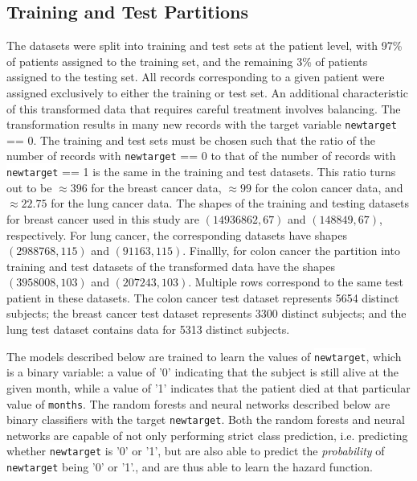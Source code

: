 \documentclass[10pt,letterpaper]{article}
\newcommand{\codewhite}[1]{\colorbox{white}{\texttt{#1}}}
\begin{document}
\subsection*{Training and Test Partitions}
\label{subsec:traintest}


The datasets were split into training and test sets at the patient level, with 97\% of patients assigned to the training set, and the remaining 3\% of patients assigned to the testing set.
All records corresponding to a given patient were assigned exclusively to either the training or test set.
An additional characteristic of this transformed data that requires careful treatment involves balancing. The transformation results in many new records with the target variable \codewhite{newtarget} == 0. The training and test sets must be chosen such that the ratio of the number of records with \codewhite{newtarget} == 0 to that of the number of records with \codewhite{newtarget} == 1 is the same in the training and test datasets.
This ratio turns out to be $\approx 396$ for the breast cancer data, $\approx  99$ for the colon cancer data, and 
$\approx 22.75$ for the lung cancer data. 
The shapes of the training and testing datasets for breast cancer used in this study are $(14936862, 67)$ and 
$(148849, 67)$, respectively.
For lung cancer, the corresponding datasets have shapes $(2988768, 115)$ and $(91163, 115)$.
Finallly, for colon cancer the partition into training and test datasets of the transformed data have the shapes 
$(3958008, 103)$ and $(207243, 103)$. Multiple rows correspond to the same test patient in these datasets.
The colon cancer test dataset represents 5654 distinct subjects; the breast cancer test dataset represents 3300 distinct subjects; and the lung test dataset contains data for 5313 distinct subjects.

The models described below are trained to learn the values of \codewhite{newtarget}, which is a binary variable: a value of '0' indicating that the subject is still alive at the given month, while a value of '1' indicates that the patient died at that particular value of \codewhite{months}. The random forests and neural networks described below are binary classifiers with the target \codewhite{newtarget}. 
Both the random forests and neural networks are capable of not only performing strict class prediction, i.e. predicting whether \codewhite{newtarget} is '0' or '1', but are also able to predict the \textit{probability} of \codewhite{newtarget} being '0' or '1'., and are thus able to learn the hazard function.
\end{document}
